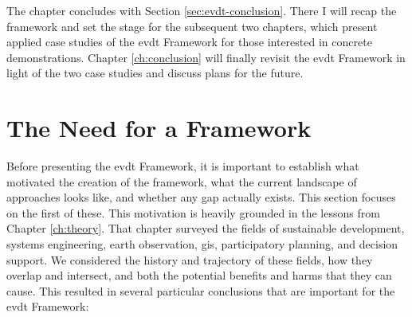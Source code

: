 The chapter concludes with Section \ref{sec:evdt-conclusion}. There I will recap the framework and set the stage for the subsequent two chapters, which present applied case studies of the \ac{evdt} Framework for those interested in concrete demonstrations. Chapter \ref{ch:conclusion} will finally revisit the \ac{evdt} Framework in light of the two case studies and discuss plans for the future. 

\section{The Need for a Framework} \label{sec:need}

Before presenting the \ac{evdt} Framework, it is important to establish what motivated the creation of the framework, what the current landscape of approaches looks like, and whether any gap actually exists. This section focuses on the first of these. This motivation is heavily grounded in the lessons from Chapter \ref{ch:theory}. That chapter surveyed the fields of sustainable development, systems engineering, earth observation, \ac{gis}, participatory planning, and decision support. We considered the history and trajectory of these fields, how they overlap and intersect, and both the potential benefits and harms that they can cause. This resulted in several particular conclusions that are important for the \ac{evdt} Framework:

